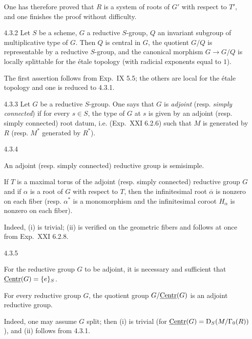 One has therefore proved that $R$ is a system of roots of $G'$ with respect to $T'$, and one finishes the proof without difficulty.
\begin{corollary}{4.3.2}\label{XXII.4.3.2}
Let $S$ be a scheme, $G$ a reductive $S$-group, $Q$ an invariant subgroup of multiplicative type of $G$. Then $Q$ is central in $G$, the quotient $G/Q$ is representable by a reductive $S$-group, and the canonical morphism $G\to G/Q$ is locally splittable for the \'etale topology (with radicial exponents equal to $1$).
\end{corollary}
The first assertion follows from Exp.~IX 5.5; the others are local for the \'etale topology and one is reduced to 4.3.1.
\begin{definition}{4.3.3}\label{XXII.4.3.3}
Let $G$ be a reductive $S$-group. One says that $G$ is \emph{adjoint} (resp. \emph{simply connected}) if for every $s\in S$, the type of $G$ at $s$ is given by an adjoint (resp. simply connected) root datum, i.e. (Exp.~XXI 6.2.6) such that $M$ is generated by $R$ (resp. $M^*$ generated by $R^*$).
\end{definition}
\begin{proposition}{4.3.4}\label{XXII.4.3.4}
\begin{enumeratei}
\item An adjoint (resp. simply connected) reductive group is semisimple.
\item If $T$ is a maximal torus of the adjoint (resp. simply connected) reductive group $G$ and if $\alpha$ is a root of $G$ with respect to $T$, then the infinitesimal root $\overline\alpha$ is nonzero on each fiber (resp. $\alpha^*$ is a monomorphism and the infinitesimal coroot $H_\alpha$ is nonzero on each fiber).
\end{enumeratei}
\end{proposition}
Indeed, (i) is trivial; (ii) is verified on the geometric fibers and follows at once from Exp.~XXI 6.2.8.
\begin{proposition}{4.3.5}\label{XXII.4.3.5}
\begin{enumeratei}
\item For the reductive group $G$ to be adjoint, it is necessary and sufficient that $\underline{\mathrm{Centr}}(G)=\{e\}_S$.
\item For every reductive group $G$, the quotient group $G/\underline{\mathrm{Centr}}(G)$ is an adjoint reductive group.
\end{enumeratei}
\end{proposition}
Indeed, one may assume $G$ split; then (i) is trivial (for $\underline{\mathrm{Centr}}(G)=\mathrm D_S(M/\Gamma_0(R))$), and (ii) follows from 4.3.1.
